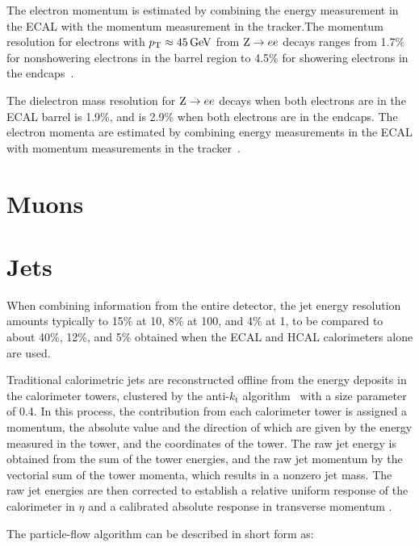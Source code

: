 The electron momentum is estimated by combining the energy measurement in the ECAL with the momentum measurement in the tracker.The momentum resolution for electrons with $p_{\mathrm{T}} \approx 45\,\text{Ge\hspace{-.08em}V}$ from $\mathrm{Z} \rightarrow {e} {e}$ decays ranges from 1.7\% for nonshowering electrons in the barrel region to 4.5\% for showering electrons in the endcaps~\cite{Khachatryan:2015hwa}.

The dielectron mass resolution for $\mathrm{Z} \rightarrow {e} {e}$ decays when both electrons are in the ECAL barrel is 1.9\%, and is 2.9\% when both electrons are in the endcaps. The electron momenta are estimated by combining energy measurements in the ECAL with momentum measurements in the tracker~\cite{Khachatryan:2015hwa}. 

\section{Muons}

\section{Jets}
\label{sec:jets}

When combining information from the entire detector, the jet energy resolution amounts typically to 15\% at 10\GeV, 8\% at 100\GeV, and 4\% at 1\TeV, to be compared to about 40\%, 12\%, and 5\% obtained when the ECAL and HCAL calorimeters alone are used.


Traditional calorimetric jets are reconstructed offline from the energy deposits in the calorimeter towers, clustered by the anti-$k_\mathrm{t}$ algorithm~\cite{Cacciari:2008gp, Cacciari:2011ma} with a size parameter of 0.4. In this process, the contribution from each calorimeter tower is assigned a momentum, the absolute value and the direction of which are given by the energy measured in the tower, and the coordinates of the tower. The raw jet energy is obtained from the sum of the tower energies, and the raw jet momentum by the vectorial sum of the tower momenta, which results in a nonzero jet mass. The raw jet energies are then corrected to establish a relative uniform response of the calorimeter in $\eta$ and a calibrated absolute response in transverse momentum \pt. 

 The particle-flow algorithm can be described in short form as:

